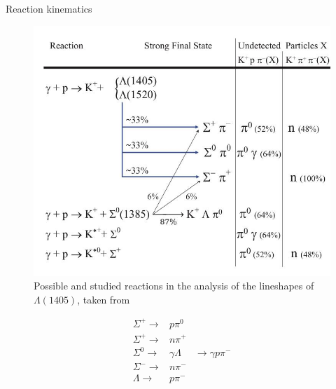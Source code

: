 \documentclass[11pt,aspectratio=1610,dvipsnames]{beamer}
\begin{document}
\begin{frame}{Reaction kinematics}
	\begin{minipage}{.65\linewidth}
		\begin{figure}[H]
			\includegraphics[width=\linewidth]{kinematics}
			\caption{Possible and studied reactions in the analysis of the lineshapes of $\Lambda(1405)$, taken from \citet{lineshapes}}
		\end{figure}	
	\end{minipage}
	\begin{minipage}{.34\linewidth}
		\begin{align*}
			\Sigma^+\to &p \pi^0\\
			\Sigma^+\to &n \pi^+\\
			\Sigma^0\to &\gamma\Lambda&\to\gamma p \pi^-\\
			\Sigma^-\to &n \pi^-\\
			\Lambda\to &p \pi^-\\
		\end{align*}
	\end{minipage}
	
\end{frame}
\end{document}
